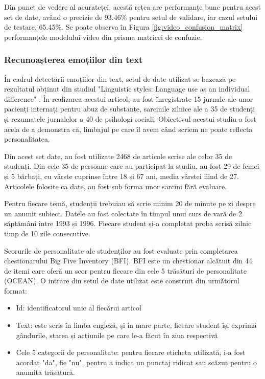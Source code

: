 \documentclass[a4paper, 12pt]{report}
\begin{document}
	Din punct de vedere al acurateței, acestă rețea are performanțe bune pentru acest set de date, având o precizie de 93.46\% pentru setul de validare, iar cazul setului de testare,  65.45\%. Se poate observa în Figura \ref{fig:video_confusion_matrix} performanțele modelului video din prisma matricei de confuzie.
	
	\clearpage
	\subsubsection{Recunoașterea emoțiilor din text}
	În cadrul detectării emoțiilor din text, setul de date utilizat se bazează pe rezultatul obținut din studiul "Linguistic styles: Language use aș an individual difference" \cite{text_dataset}. În realizarea acestui articol, au fost înregistrate 15 jurnale ale unor pacienți internați pentru abuz de substanțe, sarcinile zilnice ale a 35 de studenți și rezumatele jurnalelor a 40 de psihologi sociali. Obiectivul acestui studiu a fost acela de a demonstra că, limbajul pe care îl avem când scriem ne poate reflecta personalitatea.

	Din acest set date, au fost utilizate 2468 de articole scrise ale celor 35 de studenți. Din cele 35 de persoane care au participat la studiu, au fost 29 de femei și 5 bărbați, cu vârste cuprinse între 18 și 67 ani, media vârstei fiind de 27. Articolele folosite ca date, au fost sub forma unor sarcini fără evaluare. 

	Pentru fiecare temă, studenții trebuiau să scrie minim 20 de minute pe zi despre un anumit subiect. Datele au fost colectate în timpul unui curs de vară de 2 săptămâni între 1993 și 1996. Fiecare student și-a completat proba scrisă zilnic timp de 10 zile consecutive. 

	Scorurile de personalitate ale studenților au fost evaluate prin completarea chestionarului Big Five Inventory (BFI). BFI este un chestionar alcătuit din 44 de itemi care oferă un scor pentru fiecare din cele 5 trăsături de personalitate (OCEAN). O intrare din setul de date utilizat este construit din următorul format: 
	\begin{itemize}
		\item Id: identificatorul unic al fiecărui articol
		\item Text: este scris în limba engleză, și în mare parte, fiecare student își exprimă gândurile, starea și acțiunile pe care le-a făcut în ziua respectivă
		\item Cele 5 categorii de personalitate: pentru fiecare eticheta utilizată, i-a fost acordat "da", fie "nu", pentru a indica un punctaj ridicat sau scăzut pentru o anumită trăsătură.
	\end{itemize}
\end{document}
